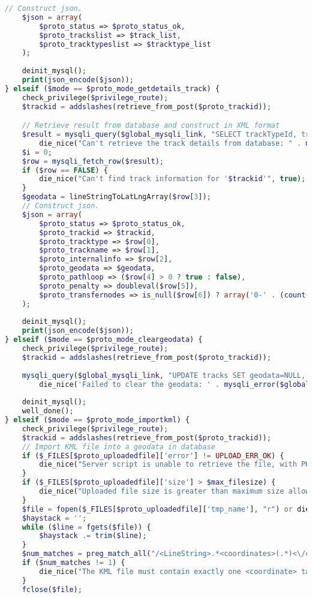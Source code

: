 \begin{lstlisting}[language=PHP,basicstyle=\tiny,caption=handle.php,label={lst:handle.php}]
	// Construct json.
	$json = array(
		$proto_status => $proto_status_ok,
		$proto_trackslist => $track_list,
		$proto_tracktypeslist => $tracktype_list
	);
	
	deinit_mysql();
	print(json_encode($json));
} elseif ($mode == $proto_mode_getdetails_track) {
	check_privilege($privilege_route);
	$trackid = addslashes(retrieve_from_post($proto_trackid));

	// Retrieve result from database and construct in XML format
	$result = mysqli_query($global_mysqli_link, "SELECT trackTypeId, trackName, internalInfo, AsText(geodata), pathloop, penalty, transferNodes FROM tracks WHERE trackId='$trackid'") or
		die_nice("Can't retrieve the track details from database: " . mysqli_error($global_mysqli_link), true);
	$i = 0;
	$row = mysqli_fetch_row($result);
	if ($row == FALSE) {
		die_nice("Can't find track information for '$trackid'", true);
	}
	$geodata = lineStringToLatLngArray($row[3]);
	// Construct json.
	$json = array(
		$proto_status => $proto_status_ok,
		$proto_trackid => $trackid,
		$proto_tracktype => $row[0],
		$proto_trackname => $row[1],
		$proto_internalinfo => $row[2],
		$proto_geodata => $geodata,
		$proto_pathloop => ($row[4] > 0 ? true : false),
		$proto_penalty => doubleval($row[5]),
		$proto_transfernodes => is_null($row[6]) ? array('0-' . (count($geodata) - 1)) : split(',', $row[6]), 
	);
	
	deinit_mysql();
	print(json_encode($json));
} elseif ($mode == $proto_mode_cleargeodata) {
	check_privilege($privilege_route);
	$trackid = addslashes(retrieve_from_post($proto_trackid));
	
	mysqli_query($global_mysqli_link, "UPDATE tracks SET geodata=NULL, transferNodes=NULL WHERE trackId='$trackid'") or
		die_nice('Failed to clear the geodata: ' . mysqli_error($global_mysqli_link), true);
	
	deinit_mysql();
	well_done();
} elseif ($mode == $proto_mode_importkml) {
	check_privilege($privilege_route);
	$trackid = addslashes(retrieve_from_post($proto_trackid));
	// Import KML file into a geodata in database
	if ($_FILES[$proto_uploadedfile]['error'] != UPLOAD_ERR_OK) {
		die_nice("Server script is unable to retrieve the file, with PHP's UPLOAD_ERR_xxx code: " . $_FILES[$proto_uploadedfile]['error'], true);
	}
	if ($_FILES[$proto_uploadedfile]['size'] > $max_filesize) {
		die_nice("Uploaded file size is greater than maximum size allowed ($max_filesize)", true);
	}
	$file = fopen($_FILES[$proto_uploadedfile]['tmp_name'], "r") or die_nice('Unable to open uploaded file', true);
	$haystack = '';
	while ($line = fgets($file)) {
		$haystack .= trim($line);
	}
	$num_matches = preg_match_all("/<LineString>.*<coordinates>(.*)<\/coordinates>.*<\/LineString>/i", $haystack, $matches, PREG_PATTERN_ORDER);
	if ($num_matches != 1) {
		die_nice("The KML file must contain exactly one <coordinate> tag inside one <LineString> tag. But I found $num_matches occurences", true);
	}
	fclose($file);
	

\end{lstlisting}
